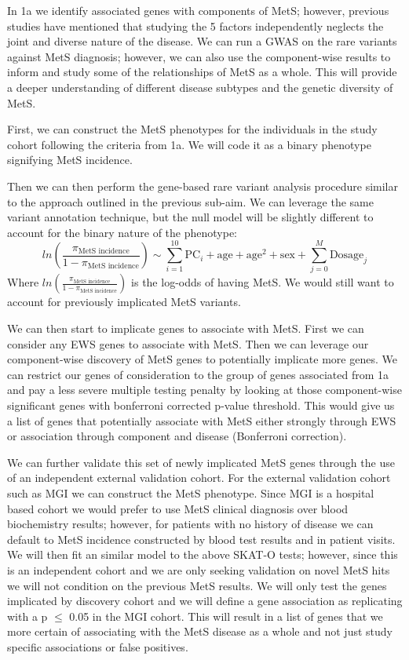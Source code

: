 \documentclass[11pt]{article}
\begin{document}
\noindent {}

In 1a we identify associated genes with components of MetS; however, previous studies have mentioned that studying the 5 factors independently neglects the joint and diverse nature of the disease. We can run a GWAS on the rare variants against MetS diagnosis; however, we can also use the component-wise results to inform and study some of the relationships of MetS as a whole. This will provide a deeper understanding of different disease subtypes and the genetic diversity of MetS.

\noindent {}

First, we can construct the MetS phenotypes for the individuals in the study cohort following the criteria from 1a. We will code it as a binary phenotype signifying MetS incidence.

Then we can then perform the gene-based rare variant analysis procedure similar to the approach outlined in the previous sub-aim. We can leverage the same variant annotation technique, but the null model will be slightly different to account for the binary nature of the phenotype:
$$ln(\frac{\pi_\text{MetS incidence}}{1-\pi_\text{MetS incidence}}) \sim \sum_{i=1}^{10} \text{PC}_i + \text{age} + \text{age}^2 + \text{sex} + \sum_{j=0}^{M}\text{Dosage}_j$$
Where $ln(\frac{\pi_\text{MetS incidence}}{1-\pi_\text{MetS incidence}})$ is the log-odds of having MetS. We would still want to account for previously implicated MetS variants. 

We can then start to implicate genes to associate with MetS. First we can consider any EWS genes to associate with MetS. Then we can leverage our component-wise discovery of MetS genes to potentially implicate more genes. We can restrict our genes of consideration to the group of genes associated from 1a and pay a less severe multiple testing penalty by looking at those component-wise significant genes with bonferroni corrected p-value threshold. This would give us a list of genes that potentially associate with MetS either strongly through EWS or association through component and disease (Bonferroni correction).

We can further validate this set of newly implicated MetS genes through the use of an independent external validation cohort. For the external validation cohort such as MGI we can construct the MetS phenotype. Since MGI is a hospital based cohort we would prefer to use MetS clinical diagnosis over blood biochemistry results; however, for patients with no history of disease we can default to MetS incidence constructed by blood test results and in patient visits. We will then fit an similar model to the above SKAT-O tests; however, since this is an independent cohort and we are only seeking validation on novel MetS hits we will not condition on the previous MetS results. We will only test the genes implicated by discovery cohort and we will define a gene association as replicating with a p $\le$ 0.05 in the MGI cohort. This will result in a list of genes that we more certain of associating with the MetS disease as a whole and not just study specific associations or false positives.
\end{document}
